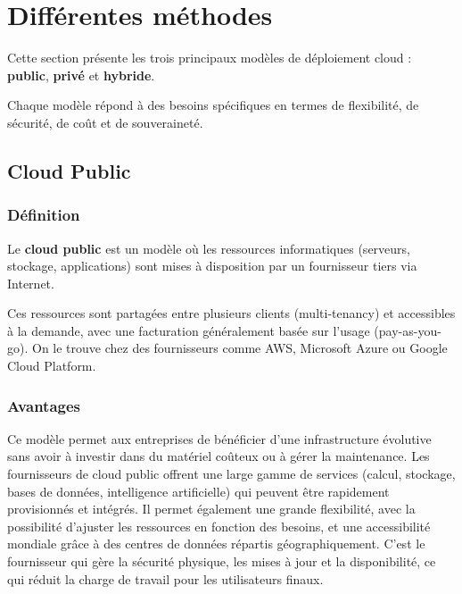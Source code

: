\documentclass{rapportClass} %
\begin{document}
\section{Différentes méthodes}

Cette section présente les trois principaux modèles de déploiement
cloud : \textbf{public}, \textbf{privé} et \textbf{hybride}.

Chaque modèle répond à des besoins spécifiques en termes de
flexibilité, de sécurité, de coût et de souveraineté.

\subsection{Cloud Public}

\subsubsection{Définition}
Le \textbf{cloud public} est un modèle où les ressources informatiques
(serveurs, stockage, applications) sont mises à disposition par un
fournisseur tiers via Internet.

Ces ressources sont partagées entre plusieurs clients (multi-tenancy)
et accessibles à la demande, avec une facturation généralement basée
sur l’usage (pay-as-you-go).
On le trouve chez des fournisseurs comme AWS, Microsoft Azure ou Google Cloud Platform.


  
\subsubsection{Avantages}
Ce modèle permet aux entreprises de bénéficier d’une infrastructure évolutive sans avoir à investir dans du matériel coûteux ou à gérer la maintenance. 
Les fournisseurs de cloud public offrent une large gamme de services (calcul, stockage, bases de données, 
intelligence artificielle) qui peuvent être rapidement provisionnés et intégrés.
Il permet également une grande flexibilité, avec la possibilité d’ajuster les ressources en fonction des besoins, 
et une accessibilité mondiale grâce à des centres de données répartis géographiquement.
C'est le fournisseur qui gère la sécurité physique, les mises à jour et la disponibilité, ce qui réduit la charge de travail pour les utilisateurs finaux.
\end{document}
